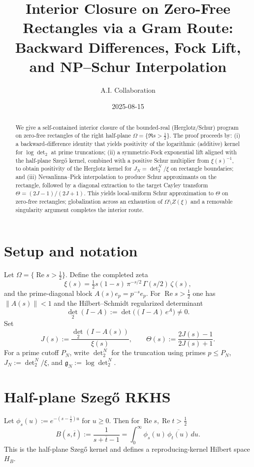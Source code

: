 \documentclass[11pt]{article}
\title{Interior Closure on Zero-Free Rectangles via a Gram Route:\\
Backward Differences, Fock Lift, and NP--Schur Interpolation}
\author{A.I. Collaboration}
\date{2025-08-15}
\theoremstyle{remark}
\newcommand{\ReS}{\operatorname{Re}}
\begin{document}
\maketitle

\begin{abstract}
We give a self-contained interior closure of the bounded-real (Herglotz/Schur) program on zero-free rectangles of the right half-plane \(\Omega=\{\Re s>\tfrac12\}\). The proof proceeds by: (i) a backward-difference identity that yields positivity of the logarithmic (additive) kernel for \(\log\det_2\) at prime truncations; (ii) a symmetric-Fock exponential lift aligned with the half-plane Szeg\H{o} kernel, combined with a positive Schur multiplier from \(\xi(s)^{-1}\), to obtain positivity of the Herglotz kernel for \(J_N=\det_2^N/\xi\) on rectangle boundaries; and (iii) Nevanlinna--Pick interpolation to produce Schur approximants on the rectangle, followed by a diagonal extraction to the target Cayley transform \(\Theta=(2J-1)/(2J+1)\). This yields local-uniform Schur approximation to \(\Theta\) on zero-free rectangles; globalization across an exhaustion of \(\Omega\setminus Z(\xi)\) and a removable singularity argument completes the interior route.
\end{abstract}

\section{Setup and notation}
Let \(\Omega=\{\ReS s>\tfrac12\}\). Define the completed zeta
\[\xi(s)=\tfrac12 s(1-s)\,\pi^{-s/2}\,\Gamma(s/2)\,\zeta(s),\]
and the prime-diagonal block \(A(s)e_p=p^{-s}e_p\). For \(\ReS s>\tfrac12\) one has \(\|A(s)\|<1\) and the Hilbert--Schmidt regularized determinant
\[\det_2(I-A):=\det\big((I-A)\,e^{A}\big)\ne 0.\]
Set
\[J(s):=\frac{\det_2(I-A(s))}{\xi(s)},\qquad \Theta(s):=\frac{2J(s)-1}{2J(s)+1}.\]
For a prime cutoff \(P_N\), write \(\det_2^N\) for the truncation using primes \(p\le P_N\), \(J_N:=\det_2^N/\xi\), and \(\mathfrak g_N:=\log\det_2^N\).

\section{Half-plane Szeg\H{o} RKHS}
Let \(\phi_s(u):=e^{-(s-\frac12)u}\) for \(u\ge0\). Then for \(\ReS s,\ReS t>\tfrac12\)
\[B(s,\overline t):=\frac{1}{s+\overline t-1}=\int_0^\infty \phi_s(u)\,\overline{\phi_t(u)}\,du.\]
This is the half-plane Szeg\H{o} kernel and defines a reproducing-kernel Hilbert space \(H_B\).
\end{document}
